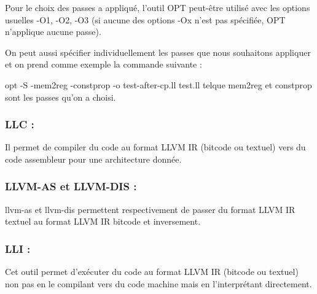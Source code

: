 \documentclass[12pt,titlepage]{article}
\begin{document}
Pour le choix des passes a appliqué, l’outil OPT peut-être utilisé avec les options usuelles -O1, -O2, -O3 (si aucune des options -Ox n’est pas spécifiée, OPT n’applique aucune passe).
      
      On peut aussi spécifier individuellement les passes que nous souhaitons appliquer et on prend comme exemple la commande suivante  :
      
      opt -S -mem2reg -constprop -o test-after-cp.ll test.ll
      telque mem2reg  et constprop  sont les passes qu’on a choisi.

    \subsubsection{ LLC :} Il permet de compiler du code au format LLVM IR (bitcode ou textuel) vers du code assembleur pour une architecture donnée. 
      
    \subsubsection{LLVM-AS et LLVM-DIS : } 
    
    llvm-as et llvm-dis permettent respectivement de passer du format LLVM IR textuel au format LLVM IR bitcode et inversement.

    \subsubsection{ LLI : } 
    Cet outil permet d’exécuter du code au format LLVM IR (bitcode ou textuel) non pas en le compilant vers du code machine mais en l’interprétant directement.
    
    

      
      
\end{document}
